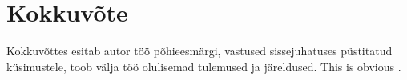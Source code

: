 \documentclass[a4paper,12pt]{article}
\begin{document}
\iffalse
\clearpage\vspace*{0pt}
\section{Võimalikud edasiarendused}

- muteeritava oleku laiendused\\
- mittedeterminismi teine gradeering nd0, 1, 01, 1+, N ja selle optimisatsioonid (pure-lambda-hoist, dead-computation)

\begin{figure}
  \begin{BVerbatim}
  \end{BVerbatim}
  \caption{}
  \label{fig:nd.something}
\end{figure}

\fi

\clearpage\vspace*{0pt}


\section{Kokkuvõte}
Kokkuvõttes esitab autor töö põhieesmärgi, vastused sissejuhatuses püstitatud
küsimustele, toob välja töö olulisemad tulemused ja järeldused.
This is obvious \cite{Benton2016}. \cite{Katsumata2014}
\clearpage\vspace*{0pt}


\renewcommand{\baselinestretch}{1.15}
\small



\end{document}
